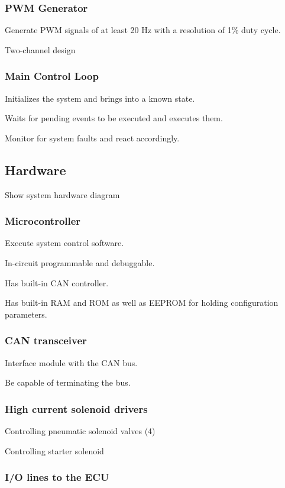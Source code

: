 \subsubsection{PWM Generator}

Generate PWM signals of at least 20 Hz with a resolution of 1\% duty
cycle.

Two-channel design


\subsubsection{Main Control Loop}

Initializes the system and brings into a known state.

Waits for pending events to be executed and executes them.

Monitor for system faults and react accordingly.


\subsection{Hardware}

Show system hardware diagram


\subsubsection{Microcontroller}

Execute system control software.

In-circuit programmable and debuggable.

Has built-in CAN controller.

Has built-in RAM and ROM as well as EEPROM for holding configuration parameters.


\subsubsection{CAN transceiver}

Interface module with the CAN bus.

Be capable of terminating the bus.


\subsubsection{High current solenoid drivers}


Controlling pneumatic solenoid valves (4)
  
Controlling starter solenoid


\subsubsection{I/O lines to the ECU}

